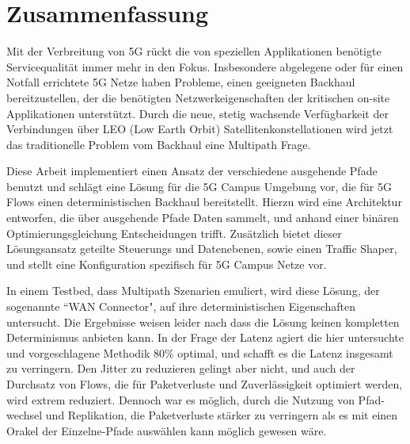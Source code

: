 \section*{Zusammenfassung}

Mit der Verbreitung von 5G rückt die von speziellen Applikationen benötigte Servicequalität immer mehr in den Fokus. Insbesondere abgelegene oder für einen Notfall errichtete 5G Netze haben Probleme, einen geeigneten Backhaul bereitzustellen, der die benötigten Netzwerkeigenschaften der kritischen on-site Applikationen unterstützt. Durch die neue, stetig wachsende Verfügbarkeit der Verbindungen über LEO (Low Earth Orbit) Satellitenkonstellationen wird jetzt das traditionelle Problem vom Backhaul eine Multipath Frage.

Diese Arbeit implementiert einen Ansatz der verschiedene ausgehende Pfade benutzt und schlägt eine Lösung für die 5G Campus Umgebung vor, die für 5G Flows einen deterministischen Backhaul bereitstellt. Hierzu wird eine Architektur entworfen, die über ausgehende Pfade Daten sammelt, und anhand einer binären Optimierungsgleichung Entscheidungen trifft. Zusätzlich bietet dieser Lösungsansatz geteilte Steuerungs und Datenebenen, sowie einen Traffic Shaper, und stellt eine Konfiguration spezifisch für 5G Campus Netze vor.

In einem Testbed, dass Multipath Szenarien emuliert, wird diese Lösung, der sogenannte “WAN Connector", auf ihre deterministischen Eigenschaften untersucht. Die Ergebnisse weisen leider nach dass die Lösung keinen kompletten Determinismus anbieten kann. In der Frage der Latenz agiert die hier untersuchte und vorgeschlagene Methodik 80\% optimal, und schafft es die Latenz insgesamt zu verringern. Den Jitter zu reduzieren gelingt aber nicht, und auch der Durchsatz von Flows, die für Paketverluste und Zuverlässigkeit optimiert werden, wird extrem reduziert. Dennoch war es möglich, durch die Nutzung von Pfad-wechsel und Replikation, die Paketverluste stärker zu verringern als es mit einen Orakel der Einzelne-Pfade auswählen kann möglich gewesen wäre.